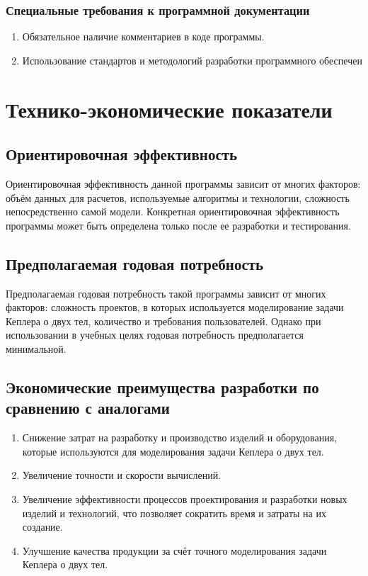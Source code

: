  \subsubsection{Специальные требования к программной документации}
 \begin{enumerate}
  \item Обязательное наличие комментариев в коде программы.
  \item Использование стандартов и методологий разработки программного обеспечен
 \end{enumerate}
 \section{Технико-экономические показатели}
 \subsection{Ориентировочная эффективность}
 Ориентировочная эффективность данной программы зависит от многих факторов: объём данных для расчетов, используемые алгоритмы и технологии, сложность непосредственно самой модели. Конкретная ориентировочная эффективность программы может быть определена только после ее разработки и тестирования.

 \subsection{Предполагаемая годовая потребность}
 Предполагаемая годовая потребность такой программы зависит от многих факторов: сложность проектов, в которых используется моделирование задачи Кеплера о двух тел, количество и требования пользователей. Однако при использовании в учебных целях годовая потребность предполагается минимальной.

 \subsection{Экономические преимущества разработки по сравнению с аналогами}
 \begin{enumerate}
  \item Снижение затрат на разработку и производство изделий и оборудования, которые используются для моделирования задачи Кеплера о двух тел.
  \item Увеличение точности и скорости вычислений.
  \item Увеличение эффективности процессов проектирования и разработки новых изделий и технологий, что позволяет сократить время и затраты на их создание.
  \item Улучшение качества продукции за счёт точного моделирования задачи Кеплера о двух тел.
 \end{enumerate}

